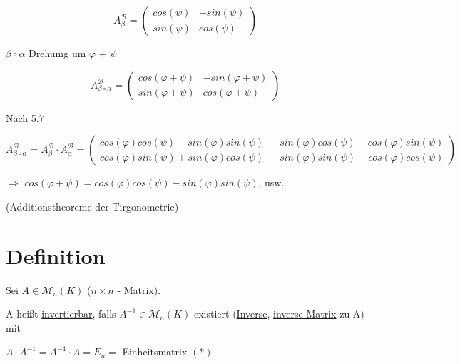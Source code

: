 \documentclass[a4paper, openany]{book}
\begin{document}
        \begin{equation}
          A_{\beta}^{\mathcal{B}} = \begin{pmatrix}cos(\psi) & - sin(\psi) \\ sin(\psi) & cos(\psi)\end{pmatrix}
        \end{equation}

        $\beta \circ \alpha$ Drehumg um $\varphi$ + $\psi$

        \begin{equation}
          A_{\beta \circ \alpha}^{\mathcal{B}} = \begin{pmatrix}cos(\varphi + \psi) & - sin(\varphi + \psi) \\ sin(\varphi + \psi) & cos(\varphi + \psi) \end{pmatrix}
        \end{equation}

        Nach 5.7

        \par \medskip

        $A_{\beta \circ \alpha}^{\mathcal{B}} = A_{\beta}^{\mathcal{B}} \cdot A_{\alpha}^{\mathcal{B}} = \begin{pmatrix}cos(\varphi) cos(\psi) - sin(\varphi) sin(\psi) & -sin(\varphi)cos(\psi) - cos(\varphi) sin(\psi) \\ cos(\varphi) sin(\psi) + sin(\varphi) cos(\psi) & -sin(\varphi) sin(\psi) + cos(\varphi) cos(\psi) \end{pmatrix}$ 

        \par \medskip

        $\Rightarrow$ $cos(\varphi + \psi) = cos(\varphi)cos(\psi) - sin(\varphi) sin(\psi)$, usw.

        (Additionstheoreme der Tirgonometrie)

        \section{Definition}

        Sei $A \in \mathcal{M}_{n} (K)$ ($n \times n$ - Matrix).

        A heißt \underline{invertierbar}, falls $A^{-1} \in \mathcal{M}_{n} (K)$ existiert (\underline{Inverse}, \underline{inverse Matrix} zu A) mit 

        \begin{center}
          $A \cdot A^{-1} = A^{-1} \cdot A = E_n =$ Einheitsmatrix $(*)$
        \end{center}
\end{document}
